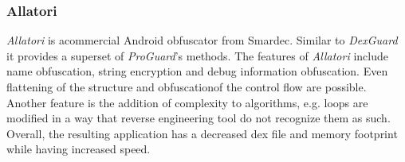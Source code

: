 \subsubsection{Allatori} \label{subsection:counter-obfuscation-solution-allatori}
\textit{Allatori} is acommercial Android obfuscator from Smardec.
Similar to \textit{DexGuard} it provides a superset of \textit{ProGuard}'s methods. \cite{allatori}
\newline
The features of \textit{Allatori} include name obfuscation, string encryption and debug information obfuscation.
Even flattening of the structure and obfuscationof the control flow are possible.
Another feature is the addition of complexity to algorithms, e.g. loops are modified in a way that reverse engineering tool do not recognize them as such.
\cite{strazzareLevel0} \cite{allatoriDoc}
\newline
Overall, the resulting application has a decreased \gls{dex} file and memory footprint while having increased speed.
